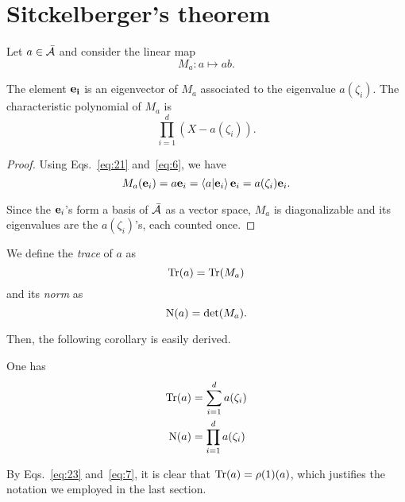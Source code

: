 \section{Sitckelberger's theorem}
\label{sec:multiplication}

Let $a\in\bar{\mathcal{A}}$ and consider the linear map
\begin{equation}
  \label{eq:18}
  M_a:a \mapsto ab
  \text{.}
\end{equation}

\begin{theorem}[Stickelberger]
  \label{th:stickelberger}
  The element $\mathbf{e_i}$ is an eigenvector of $M_a$ associated to
  the eigenvalue $a(\zeta_i)$. The characteristic polynomial of $M_a$
  is
  \[\prod_{i=1}^d(X-a(\zeta_i))\text{.}\]
\end{theorem}
\begin{proof}
  Using Eqs.~\eqref{eq:21} and~\eqref{eq:6}, we have
  \begin{equation}
    \label{eq:19}
    M_a(\mathbf{e}_i) = a\mathbf{e}_i = \left\langle a \middle| \mathbf{e}_i \right\rangle\mathbf{e}_i=a(\zeta_i)\mathbf{e}_i
    \text{.}
  \end{equation}

  Since the $\mathbf{e}_i$'s form a basis of $\bar{\mathcal{A}}$ as a
  vector space, $M_a$ is diagonalizable and its eigenvalues are the
  $a(\zeta_i)$'s, each counted once.
\end{proof}

\begin{definition}
  \label{def:trace}
  We define the \emph{trace} of $a$ as
  \[\operatorname{Tr}(a) = \operatorname{Tr}(M_a)\]
  and its \emph{norm} as
  \[\operatorname{N}(a) = \det(M_a)\text{.}\]
\end{definition}
Then, the following corollary is easily derived.

\begin{corollary}
  \label{th:stickelberger-trace-det}
  One has
  \begin{align}
    \label{eq:23}
    \operatorname{Tr}(a) &= \sum_{i=1}^da(\zeta_i)\\
    \label{eq:24}
    \operatorname{N}(a) &= \prod_{i=1}^da(\zeta_i)
  \end{align}
\end{corollary}

By Eqs.~\eqref{eq:23} and~\eqref{eq:7}, it is clear that
$\operatorname{Tr}(a)=\rho(1)(a)$, which justifies the notation we employed in the
last section. 

